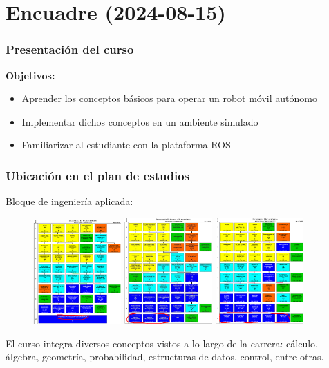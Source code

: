 \section{Encuadre (2024-08-15)}
\begin{frame}\frametitle{Presentación del curso}
  \textbf{Objetivos:}
  \begin{itemize}
  \item Aprender los conceptos básicos para operar un robot móvil autónomo
  \item Implementar dichos conceptos en un ambiente simulado
  \item Familiarizar al estudiante con la plataforma ROS
  \end{itemize}
\end{frame}

\begin{frame}\frametitle{Ubicación en el plan de estudios}
  Bloque de ingeniería aplicada:
  \begin{figure}
    \centering
    \includegraphics[width=0.3\textwidth]{Figures/PlanComputacion.png}
    \includegraphics[width=0.3\textwidth]{Figures/PlanElectronica.png}
    \includegraphics[width=0.3\textwidth]{Figures/PlanMecatronica.png}
  \end{figure}
  El curso integra diversos conceptos vistos a lo largo de la carrera: cálculo, álgebra, geometría, probabilidad, estructuras de datos, control, entre otras. 
\end{frame}

